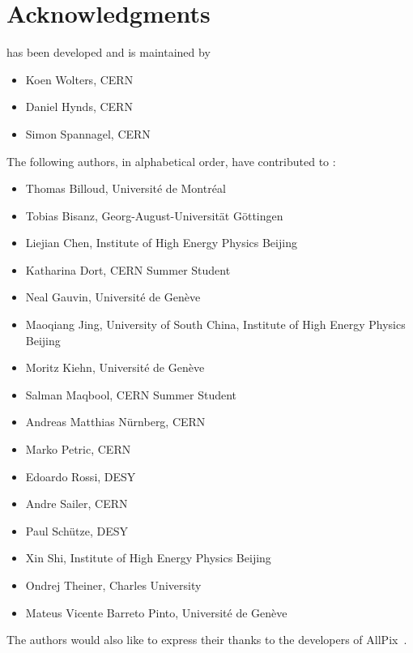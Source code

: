 \chapter{Acknowledgments}

\apsq has been developed and is maintained by

\begin{itemize}
\item Koen Wolters, CERN
\item Daniel Hynds, CERN
\item Simon Spannagel, CERN
\end{itemize}

The following authors, in alphabetical order, have contributed to \apsq:

\begin{itemize}
\item Thomas Billoud, Université de Montréal
\item Tobias Bisanz, Georg-August-Universität Göttingen
\item Liejian Chen, Institute of High Energy Physics Beijing
\item Katharina Dort, CERN Summer Student
\item Neal Gauvin, Université de Genève
\item Maoqiang Jing, University of South China, Institute of High Energy Physics Beijing
\item Moritz Kiehn, Université de Genève
\item Salman Maqbool, CERN Summer Student
\item Andreas Matthias Nürnberg, CERN
\item Marko Petric, CERN
\item Edoardo Rossi, DESY
\item Andre Sailer, CERN
\item Paul Schütze, DESY
\item Xin Shi, Institute of High Energy Physics Beijing
\item Ondrej Theiner, Charles University
\item Mateus Vicente Barreto Pinto, Université de Genève
\end{itemize}

The authors would also like to express their thanks to the developers of AllPix~\cite{ap1wiki,ap1git}.
